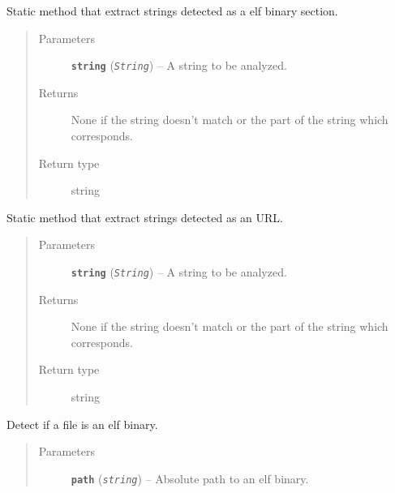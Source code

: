 \documentclass[letterpaper,10pt,oneside]{sphinxmanual}
\begin{document}
\begin{fulllineitems}
\begin{fulllineitems}
\label{index:lib.parser.Parser.getSection}
Static method that extract strings detected as a elf binary section.
\begin{quote}\begin{description}
\item[{Parameters}] \leavevmode
\textbf{\texttt{string}} (\emph{\texttt{String}}) -- A string to be analyzed.

\item[{Returns}] \leavevmode
None if the string doesn't match or the part of the string
which corresponds.

\item[{Return type}] \leavevmode
string

\end{description}\end{quote}

\end{fulllineitems}


\begin{fulllineitems}
\label{index:lib.parser.Parser.getUrl}
Static method that extract strings detected as an URL.
\begin{quote}\begin{description}
\item[{Parameters}] \leavevmode
\textbf{\texttt{string}} (\emph{\texttt{String}}) -- A string to be analyzed.

\item[{Returns}] \leavevmode
None if the string doesn't match or the part of the string
which corresponds.

\item[{Return type}] \leavevmode
string

\end{description}\end{quote}

\end{fulllineitems}


\begin{fulllineitems}
\label{index:lib.parser.Parser.isValidBin}
Detect if a file is an elf binary.
\begin{quote}\begin{description}
\item[{Parameters}] \leavevmode
\textbf{\texttt{path}} (\emph{\texttt{string}}) -- Absolute path to an elf binary.


\end{description}
\end{quote}
\end{fulllineitems}
\end{fulllineitems}
\end{document}
